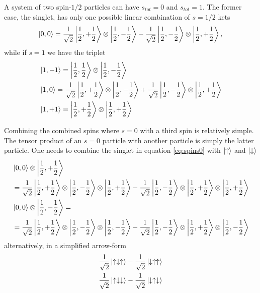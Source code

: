 \documentclass{article}
\begin{document}
A system of two spin-$1/2$ particles can have $s_{tot}=0$ and $s_{tot}=1$. The former case, the singlet, has only one possible linear combination of $s=1/2$ kets
\begin{equation}
\label{eq:spins0}
\ket{0,0}=\frac{1}{\sqrt{2}}\ket{\frac{1}{2},+\frac{1}{2}}\otimes\ket{\frac{1}{2},-\frac{1}{2}}-\frac{1}{\sqrt{2}}\ket{\frac{1}{2},-\frac{1}{2}}\otimes\ket{\frac{1}{2},+\frac{1}{2}},
\end{equation}
while if $s=1$ we have the triplet
\begin{align}
\label{eq:spins1-1}
&\ket{1,-1} = \ket{\frac{1}{2},\frac{1}{2}}\otimes\ket{\frac{1}{2},-\frac{1}{2}} \\
\label{eq:spins10}
&\ket{1, 0} = \frac{1}{\sqrt{2}}\ket{\frac{1}{2},+\frac{1}{2}}\otimes\ket{\frac{1}{2},-\frac{1}{2}} + \frac{1}{\sqrt{2}}\ket{\frac{1}{2},-\frac{1}{2}}\otimes\ket{\frac{1}{2},+\frac{1}{2}} \\
\label{eq:spins1+1}
&\ket{1,+1} = \ket{\frac{1}{2},+\frac{1}{2}}\otimes\ket{\frac{1}{2},+\frac{1}{2}}
\end{align}

Combining the combined spins where $s=0$ with a third spin is relatively simple. The tensor product of an $s=0$ particle with another particle is simply the latter particle. One needs to combine the singlet in equation \ref{eq:spins0} with $\ket{\uparrow}$ and $\ket{\downarrow}$
\begin{align*}
&\ket{0,0}\otimes\ket{\frac{1}{2},+\frac{1}{2}} \\
&=\frac{1}{\sqrt{2}}\ket{\frac{1}{2},+\frac{1}{2}}\otimes\ket{\frac{1}{2},-\frac{1}{2}}\otimes\ket{\frac{1}{2},+\frac{1}{2}}-\frac{1}{\sqrt{2}}\ket{\frac{1}{2},-\frac{1}{2}}\otimes\ket{\frac{1}{2},+\frac{1}{2}}\otimes\ket{\frac{1}{2},+\frac{1}{2}} \\
&\ket{0,0}\otimes\ket{\frac{1}{2},-\frac{1}{2}}= \\
&=\frac{1}{\sqrt{2}}\ket{\frac{1}{2},+\frac{1}{2}}\otimes\ket{\frac{1}{2},-\frac{1}{2}}\otimes\ket{\frac{1}{2},-\frac{1}{2}}-\frac{1}{\sqrt{2}}\ket{\frac{1}{2},-\frac{1}{2}}\otimes\ket{\frac{1}{2},+\frac{1}{2}}\otimes\ket{\frac{1}{2},-\frac{1}{2}}
\end{align*}
alternatively, in a simplified arrow-form
\begin{align}
\frac{1}{\sqrt{2}}\ket{\uparrow\downarrow\uparrow}-\frac{1}{\sqrt{2}}\ket{\downarrow\uparrow\uparrow} \\
\frac{1}{\sqrt{2}}\ket{\uparrow\downarrow\downarrow}-\frac{1}{\sqrt{2}}\ket{\downarrow\uparrow\downarrow}
\end{align}
\end{document}
